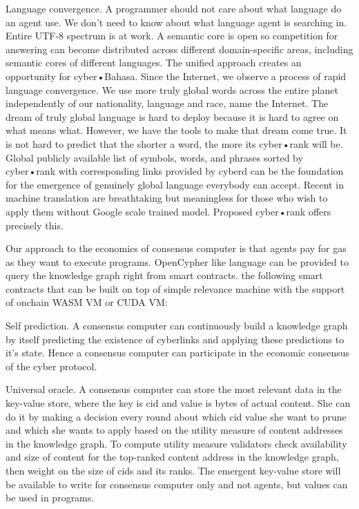 \documentclass[8pt,oneside]{amsart}
\newcommand{\linkgreen}[2]{\href{#1}{\color{green}{#2}}}
\newcommand{\code}[1]{{\PlayBold #1}}
\begin{document}
\code{Language convergence}. A programmer should not care about what language do an agent use. We don't need to know about what language agent is searching in. Entire UTF-8 spectrum is at work. A semantic core is open so competition for answering can become distributed across different domain-specific areas, including semantic cores of different languages. The unified approach creates an opportunity for cyber•Bahasa. Since the Internet, we observe a process of rapid language convergence. We use more truly global words across the entire planet independently of our nationality, language and race, name the Internet. The dream of truly global language is hard to deploy because it is hard to agree on what means what. However, we have the tools to make that dream come true. It is not hard to predict that the shorter a word, the more its cyber•rank will be. Global publicly available list of symbols, words, and phrases sorted by cyber•rank with corresponding links provided by cyberd can be the foundation for the emergence of genuinely global language everybody can accept. Recent \linkgreen{https://ipfs.io/ipfs/QmQUWBhDMfPKgFt3NfbxM1VU22oU8CRepUzGPBDtopwap1}{scientific advances} in machine translation are breathtaking but meaningless for those who wish to apply them without Google scale trained model. Proposed cyber•rank offers precisely this.

Our approach to the economics of consensus computer is that agents pay for gas as they want to execute programs. OpenCypher like language can be provided to query the knowledge graph right from smart contracts. \linkgreen{https://medium.com/@karpathy/software-2-0-a64152b37c35}{We can envision} the following smart contracts that can be built on top of simple relevance machine with the support of onchain WASM VM or CUDA VM:

\code{Self prediction}. A consensus computer can continuously build a knowledge graph by itself predicting the existence of cyberlinks and applying these predictions to it's state. Hence a consensus computer can participate in the economic consensus of the cyber protocol.

\code{Universal oracle}. A consensus computer can store the most relevant data in the key-value store, where the key is cid and value is bytes of actual content. She can do it by making a decision every round about which cid value she want to prune and which she wants to apply based on the utility measure of content addresses in the knowledge graph. To compute utility measure validators check availability and size of content for the top-ranked content address in the knowledge graph, then weight on the size of cids and its ranks. The emergent key-value store will be available to write for consensus computer only and not agents, but values can be used in programs.
\end{document}
